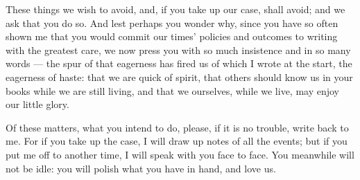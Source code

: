  These things we wish to avoid, and, if you take up our case, shall avoid; and we ask that you do so. And lest perhaps you wonder why, since you have so often shown me that you would commit our times' policies and outcomes to writing with the greatest care, we now press you with so much insistence and in so many words --- the spur of that eagerness has fired us of which I wrote at the start, the eagerness of haste: that we are quick of spirit, that others should know us in your books while we are still living, and that we ourselves, while we live, may enjoy our little glory.

 Of these matters, what you intend to do, please, if it is no trouble, write back to me. For if you take up the case, I will draw up notes of all the events; but if you put me off to another time, I will speak with you face to face. You meanwhile will not be idle: you will polish what you have in hand, and love us.
